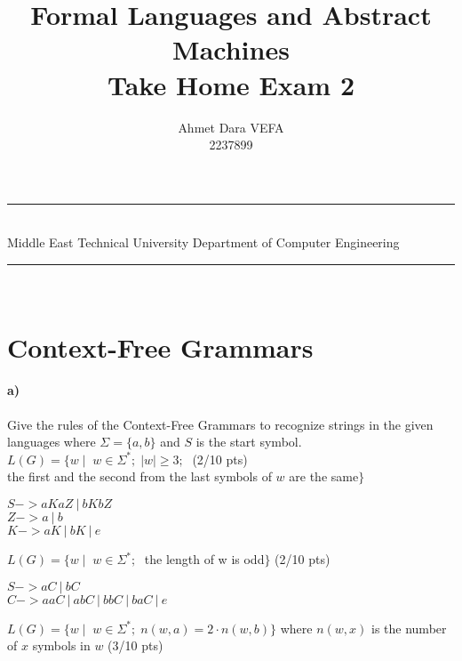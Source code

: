 \documentclass[a4paper,12pt]{article}
\title{Formal Languages and Abstract Machines \\ Take Home Exam 2}
\author{Ahmet Dara VEFA \\ 2237899} %
\date{} %
\newcommand{\HRule}{\rule{\linewidth}{1mm}}
\begin{document}
\HRule\\
Middle East Technical University \hfill Department of Computer Engineering
{\let\newpage\relax\maketitle}
\HRule\\
\vspace{1cm}


\section{Context-Free Grammars \hfill {}}

\paragraph{a)} Give the rules of the Context-Free Grammars to recognize strings in the given languages where $\Sigma=\{a,b\}$ and $S$ is the start symbol. \\  

$L(G)=\{w \mid \;  w \in \Sigma^*;\; |w| \geq 3;\; $  \hfill \small{(2/10 pts)} \\
\hspace*{22mm} the first and the second from the last symbols of $w$ are the same$\}$ \\

\begin{tcolorbox}
$S-> aKaZ \ | \  bKbZ$
\\
$Z-> a \ | \ b$
\\
$K-> aK\ | \ bK \ | \ e $
\end{tcolorbox}


$L(G)=\{w \mid \;  w \in \Sigma^*;\; $ the length of w is odd$\}$ \hfill \small{(2/10 pts)} \\

\begin{tcolorbox}
$S-> aC \ | \ bC$
\\
$C-> aaC \ | \ abC\ | \ bbC \ | \ baC \ | \ e$
\end{tcolorbox}


$L(G)=\{w \mid \;  w \in \Sigma^*;\; n(w,a)=2\cdot n(w,b)\}$ where $n(w,x)$ is the number of $x$ symbols in $w$ \hfill \small{(3/10 pts)} \\
\end{document}
